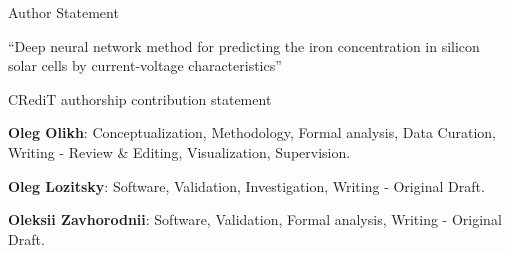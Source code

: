 \documentclass[preprint]{elsarticle}
\begin{document}
Author Statement

\vspace{1cm}
``Deep neural network method for predicting the iron concentration in silicon solar cells by current-voltage characteristics''
\vspace{1cm}

CRediT authorship contribution statement
\vspace{1cm}

\textbf{Oleg Olikh}: Conceptualization, Methodology, Formal analysis, Data Curation, Writing - Review \& Editing, Visualization, Supervision. 

\textbf{Oleg Lozitsky}: Software, Validation, Investigation, Writing - Original Draft. 

\textbf{Oleksii Zavhorodnii}: Software, Validation, Formal analysis, Writing - Original Draft.
\end{document}
